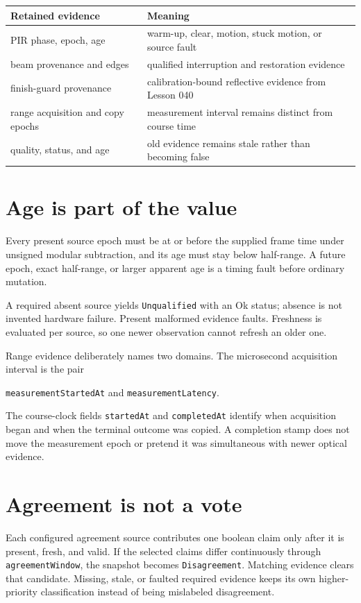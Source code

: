 \documentclass[11pt]{article}
\begin{document}
\begin{tabularx}{\linewidth}{@{}l X@{}}
\toprule
Retained evidence & Meaning\\
\midrule
PIR phase, epoch, age & warm-up, clear, motion, stuck motion, or source fault\\
beam provenance and edges & qualified interruption and restoration evidence\\
finish-guard provenance & calibration-bound reflective evidence from Lesson 040\\
range acquisition and copy epochs & measurement interval remains distinct from course time\\
quality, status, and age & old evidence remains stale rather than becoming false\\
\bottomrule
\end{tabularx}

\section{Age is part of the value}
Every present source epoch must be at or before the supplied frame time under
unsigned modular subtraction, and its age must stay below half-range. A future
epoch, exact half-range, or larger apparent age is a timing fault before
ordinary mutation.

A required absent source yields \texttt{Unqualified} with an Ok status; absence
is not invented hardware failure. Present malformed evidence faults. Freshness
is evaluated per source, so one newer observation cannot refresh an older one.

Range evidence deliberately names two domains. The microsecond acquisition
interval is the pair
\begin{center}
\texttt{measurementStartedAt} and \texttt{measurementLatency}.
\end{center}
The course-clock fields \texttt{startedAt} and \texttt{completedAt} identify
when acquisition began and when the terminal outcome was copied. A completion
stamp does not move the measurement epoch or pretend it was simultaneous with
newer optical evidence.

\section{Agreement is not a vote}
Each configured agreement source contributes one boolean claim only after it
is present, fresh, and valid. If the selected claims differ continuously
through \texttt{agreementWindow}, the snapshot becomes
\texttt{Disagreement}. Matching evidence clears that candidate. Missing,
stale, or faulted required evidence keeps its own higher-priority
classification instead of being mislabeled disagreement.
\end{document}
